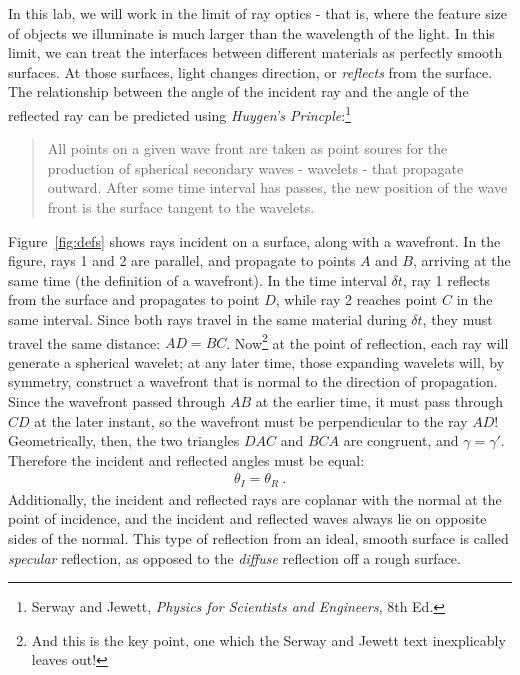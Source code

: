 \documentclass[12pt]{article}
\begin{document}
In this lab, we will work in the limit of ray optics - that is, where
the feature size of objects we illuminate is much larger than the
wavelength of the light.  In this limit, we can treat the interfaces
between different materials as perfectly smooth surfaces.  At those
surfaces, light changes direction, or \textit{reflects} from the
surface.  The relationship between the angle of the incident ray and
the angle of the reflected ray can be predicted using \textit{Huygen's
  Princple}:\footnote{Serway and Jewett, \textit{Physics for
    Scientists and Engineers}, 8th Ed.}
\begin{quote}
  All points on a given wave front are taken as point soures for the
  production of spherical secondary waves - wavelets - that propagate
  outward.  After some time interval has passes, the new position of
  the wave front is the surface tangent to the wavelets.
\end{quote}
Figure~\ref{fig:defs} shows rays incident on a surface, along with a
wavefront.  In the figure, rays 1 and 2 are parallel, and propagate to
points $A$ and $B$, arriving at the same time (the definition of a
wavefront).  In the time interval $\delta t$, ray 1 reflects from the
surface and propagates to point $D$, while ray 2 reaches point $C$ in
the same interval.  Since both rays travel in the same material during
$\delta t$, they must travel the same distance: $AD = BC$.
Now\footnote{And this is the key point, one which the Serway and
  Jewett text inexplicably leaves out!} at the point of reflection,
each ray will generate a spherical wavelet; at any later time, those
expanding wavelets will, by symmetry, construct a wavefront that is
normal to the direction of propagation.  Since the wavefront passed
through $AB$ at the earlier time, it must pass through $CD$ at the
later instant, so the wavefront must be perpendicular to the ray $AD$!
Geometrically, then, the two triangles $DAC$ and $BCA$ are congruent,
and $\gamma = \gamma'$.  Therefore the incident and reflected angles
must be equal:
\begin{gather*}
  \theta_I = \theta_R\ .
\end{gather*}
Additionally, the incident and reflected rays are coplanar with the
normal at the point of incidence, and the incident and reflected waves
always lie on opposite sides of the normal.  This type of reflection
from an ideal, smooth surface is called \textit{specular} reflection,
as opposed to the \textit{diffuse} reflection off a rough surface.
\end{document}
